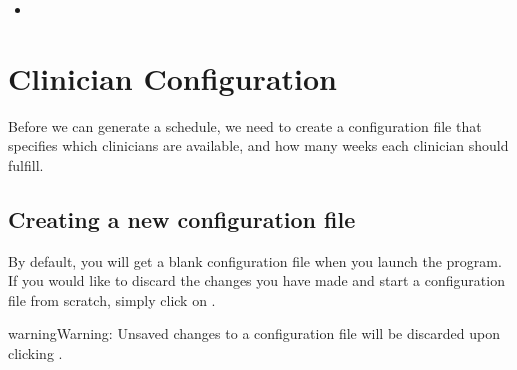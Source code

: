 \documentclass[letterpaper,10pt,english]{sphinxmanual}
\begin{document}
\begin{sphinxShadowBox}
\begin{itemize}
\begin{itemize}
\item {} 
\label{\detokenize{manual:id14}}{\hyperref[\detokenize{manual:exporting-a-schedule}]{}}

\item {} 
\label{\detokenize{manual:id15}}{\hyperref[\detokenize{manual:publishing-a-schedule-to-google-calendar}]{}}

\item {} 
\label{\detokenize{manual:id16}}{\hyperref[\detokenize{manual:clearing-a-published-schedule}]{}}

\end{itemize}

\item {} 
\label{\detokenize{manual:id17}}{\hyperref[\detokenize{manual:sample-output}]{}}

\end{itemize}
\end{sphinxShadowBox}


\chapter{Clinician Configuration}
\label{\detokenize{manual:clinician-configuration}}\label{\detokenize{manual:id1}}
Before we can generate a schedule, we need to create a configuration file
that specifies which clinicians are available, and how many weeks each
clinician should fulfill.


\section{Creating a new configuration file}
\label{\detokenize{manual:creating-a-new-configuration-file}}
By default, you will get a blank configuration file when you launch
the program. If you would like to discard the changes you have made and
start a configuration file from scratch, simply click on .

\begin{figure}[H]
\centering
{}\end{figure}

\begin{sphinxadmonition}{warning}{Warning:}
Unsaved changes to a configuration file will be discarded upon clicking
.
\end{sphinxadmonition}
\end{document}
